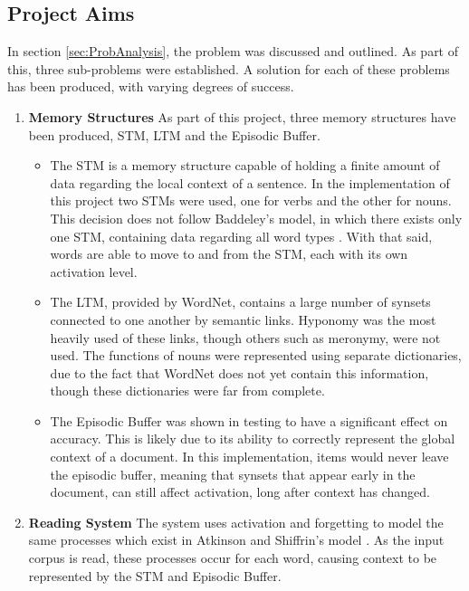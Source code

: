 \documentclass[]{article}
\begin{document}
\subsection{Project Aims}
\label{ConcAims}
In section \ref{sec:ProbAnalysis}, the problem was discussed and outlined. As part of this, three sub-problems were established. A solution for each of these problems has been produced, with varying degrees of success.

\begin{enumerate}
	\item \textbf{Memory Structures} \newline
		As part of this project, three memory structures have been produced, STM, LTM and the Episodic Buffer.
		\begin{itemize}
			\item The STM is a memory structure capable of holding a finite amount of data regarding the local context of a sentence. In the implementation of this project two STMs were used, one for verbs and the other for nouns. This decision does not follow Baddeley's model, in which there exists only one STM, containing data regarding all word types \cite{MemoryBaddeleyEysenkAnderson}. With that said, words are able to move to and from the STM, each with its own activation level.
			
			\item The LTM, provided by WordNet, contains a large number of synsets connected to one another by semantic links. Hyponomy was the most heavily used of these links, though others such as meronymy, were not used. The functions of nouns were represented using separate dictionaries, due to the fact that WordNet does not yet contain this information, though these dictionaries were far from complete.
			
			\item The Episodic Buffer was shown in testing to have a significant effect on accuracy. This is likely due to its ability to correctly represent the global context of a document. In this implementation, items would never leave the episodic buffer, meaning that synsets that appear early in the document, can still affect activation, long after context has changed.
		\end{itemize}		 
		
	\item \textbf{Reading System} \newline
		The system uses activation and forgetting to model the same processes which exist in Atkinson and Shiffrin's model \cite{ControlProcessesSTMAtkinson}. As the input corpus is read, these processes occur for each word, causing context to be represented by the STM and Episodic Buffer. 
		

\end{enumerate}
\end{document}
